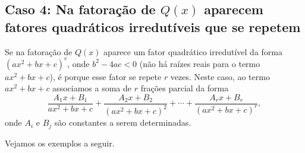 \subsection{Caso 4: Na fatoração de $Q(x)$ aparecem fatores quadráticos irredutíveis que se repetem}

Se na fatoração de $Q(x)$ aparece um fator quadrático irredutível da forma $(ax^2 + bx + c)^r$, onde $b^2 - 4ac < 0$ (não há raízes reais para o termo $ax^2 + bx + c$), é porque esse fator se repete $r$ vezes. Neste caso, ao termo $ax^2 + bx + c$ associamos a soma de $r$ frações parcial da forma
$$\dfrac{A_1x + B_1}{ax^2 + bx + c} + \dfrac{A_2x + B_2}{(ax^2 + bx + c)^2} + \cdots  + \dfrac{A_rx + B_r}{(ax^2 + bx + c)^r},$$
onde $A_i$ e $B_j$ são constantes a serem determinadas.

Vejamos os exemplos a seguir.

